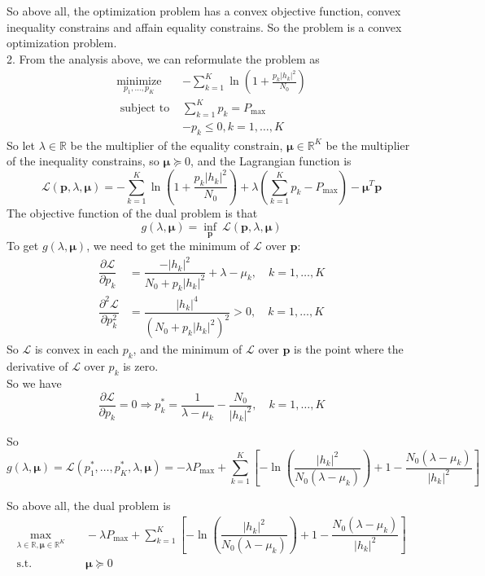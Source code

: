 So above all, the optimization problem has a convex objective function, convex inequality constrains and affain equality constrains. So the problem is a convex optimization problem. \\

2. From the analysis above, we can reformulate the problem as
$$
\begin{aligned}
\underset{p_1, \ldots, p_K}{\operatorname{minimize}}\;\; & -\sum_{k=1}^K \ln \left(1+\frac{p_k\left|h_k\right|^2}{N_0}\right) \\
\text { subject to } & \sum_{k=1}^K p_k=P_{\max } \\
& -p_k \leq 0, k=1, \ldots, K
\end{aligned}
$$
So let $\lambda\in\mathbb{R}$ be the multiplier of the equality constrain, $\pmb \mu\in\mathbb{R}^K$ be the multiplier of the inequality constrains, so $\pmb \mu\succeq 0$, and the Lagrangian function is
$$\mathcal{L}(\pmb p, \lambda, \pmb \mu) = -\sum_{k=1}^K \ln \left(1+\frac{p_k\left|h_k\right|^2}{N_0}\right) + \lambda\left(\sum_{k=1}^K p_k-P_{\max }\right) - \pmb \mu^T\pmb p$$
The objective function of the dual problem is that
$$g(\lambda, \pmb \mu) = \underset{\pmb p}{\operatorname{inf}}\ \mathcal{L}(\pmb p, \lambda, \pmb \mu)$$
To get $g(\lambda,\pmb\mu)$, we need to get the minimum of $\mathcal{L}$ over $\pmb p$:
\begin{align*}
\dfrac{\partial \mathcal{L}}{\partial p_k} &= \dfrac{-\left|h_k\right|^2}{N_0+ p_k\left|h_k\right|^2} + \lambda - \mu_k, \quad k=1,\ldots,K \\
\dfrac{\partial^2 \mathcal{L}}{\partial p_k^2} &= \dfrac{\left|h_k\right|^4}{\left(N_0+ p_k\left|h_k\right|^2\right)^2} > 0, \quad k=1,\ldots,K
\end{align*}
So $\mathcal{L}$ is convex in each $p_k$, and the minimum of $\mathcal{L}$ over $\pmb p$ is the point where the derivative of $\mathcal{L}$ over $p_k$ is zero. \\
So we have
$$\dfrac{\partial \mathcal{L}}{\partial p_k} = 0 \Rightarrow p_k^* = \dfrac{1}{\lambda-\mu_k} - \dfrac{N_0}{\left|h_k\right|^2}, \quad k=1,\ldots,K$$

So
$$g(\lambda, \pmb \mu) = \mathcal{L}(p_1^*,\ldots,p_K^*,\lambda,\pmb \mu) = -\lambda P_{\max} + \sum_{k=1}^K \left[ -\ln \left(\dfrac{\left|h_k\right|^2}{N_0(\lambda-\mu_k)}\right) + 1 - \dfrac{N_0(\lambda-\mu_k)}{\left|h_k\right|^2} \right]$$

So above all, the dual problem is
\begin{align*}
\max_{\lambda\in\mathbb{R},\pmb \mu\in\mathbb{R}^K} &\quad -\lambda P_{\max} + \sum_{k=1}^K \left[ -\ln \left(\dfrac{\left|h_k\right|^2}{N_0(\lambda-\mu_k)}\right) + 1 - \dfrac{N_0(\lambda-\mu_k)}{\left|h_k\right|^2}\right] \\
\text{s.t.} &\quad \pmb \mu \succeq 0
\end{align*}

